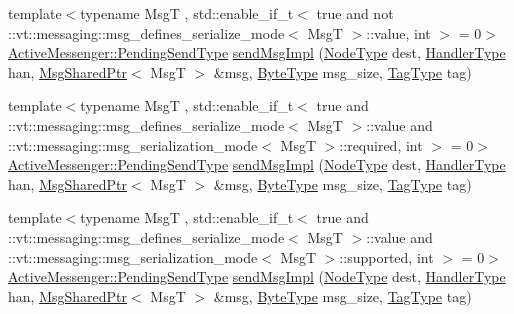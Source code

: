 \begin{DoxyCompactItemize}
\item 
{\footnotesize template$<$typename MsgT , std\+::enable\+\_\+if\+\_\+t$<$ true and not \+::vt\+::messaging\+::msg\+\_\+defines\+\_\+serialize\+\_\+mode$<$ Msg\+T $>$\+::value, int $>$  = 0$>$ }\\\hyperlink{structvt_1_1messaging_1_1_active_messenger_a3626a6ca76d8ad4ec7c3b47a2c70d3a8}{Active\+Messenger\+::\+Pending\+Send\+Type} \hyperlink{structvt_1_1messaging_1_1_active_messenger_ae4d52bd4014fe9cfee3a60bf477fe998}{send\+Msg\+Impl} (\hyperlink{namespacevt_a866da9d0efc19c0a1ce79e9e492f47e2}{Node\+Type} dest, \hyperlink{namespacevt_af64846b57dfcaf104da3ef6967917573}{Handler\+Type} han, \hyperlink{structvt_1_1messaging_1_1_msg_shared_ptr}{Msg\+Shared\+Ptr}$<$ MsgT $>$ \&msg, \hyperlink{namespacevt_aab8d55968084610ce3b17057981e9300}{Byte\+Type} msg\+\_\+size, \hyperlink{namespacevt_a84ab281dae04a52a4b243d6bf62d0e52}{Tag\+Type} tag)
\item 
{\footnotesize template$<$typename MsgT , std\+::enable\+\_\+if\+\_\+t$<$ true and \+::vt\+::messaging\+::msg\+\_\+defines\+\_\+serialize\+\_\+mode$<$ Msg\+T $>$\+::value and \+::vt\+::messaging\+::msg\+\_\+serialization\+\_\+mode$<$ Msg\+T $>$\+::required, int $>$  = 0$>$ }\\\hyperlink{structvt_1_1messaging_1_1_active_messenger_a3626a6ca76d8ad4ec7c3b47a2c70d3a8}{Active\+Messenger\+::\+Pending\+Send\+Type} \hyperlink{structvt_1_1messaging_1_1_active_messenger_ae4d52bd4014fe9cfee3a60bf477fe998}{send\+Msg\+Impl} (\hyperlink{namespacevt_a866da9d0efc19c0a1ce79e9e492f47e2}{Node\+Type} dest, \hyperlink{namespacevt_af64846b57dfcaf104da3ef6967917573}{Handler\+Type} han, \hyperlink{structvt_1_1messaging_1_1_msg_shared_ptr}{Msg\+Shared\+Ptr}$<$ MsgT $>$ \&msg, \hyperlink{namespacevt_aab8d55968084610ce3b17057981e9300}{Byte\+Type} msg\+\_\+size, \hyperlink{namespacevt_a84ab281dae04a52a4b243d6bf62d0e52}{Tag\+Type} tag)
\item 
{\footnotesize template$<$typename MsgT , std\+::enable\+\_\+if\+\_\+t$<$ true and \+::vt\+::messaging\+::msg\+\_\+defines\+\_\+serialize\+\_\+mode$<$ Msg\+T $>$\+::value and \+::vt\+::messaging\+::msg\+\_\+serialization\+\_\+mode$<$ Msg\+T $>$\+::supported, int $>$  = 0$>$ }\\\hyperlink{structvt_1_1messaging_1_1_active_messenger_a3626a6ca76d8ad4ec7c3b47a2c70d3a8}{Active\+Messenger\+::\+Pending\+Send\+Type} \hyperlink{structvt_1_1messaging_1_1_active_messenger_ae4d52bd4014fe9cfee3a60bf477fe998}{send\+Msg\+Impl} (\hyperlink{namespacevt_a866da9d0efc19c0a1ce79e9e492f47e2}{Node\+Type} dest, \hyperlink{namespacevt_af64846b57dfcaf104da3ef6967917573}{Handler\+Type} han, \hyperlink{structvt_1_1messaging_1_1_msg_shared_ptr}{Msg\+Shared\+Ptr}$<$ MsgT $>$ \&msg, \hyperlink{namespacevt_aab8d55968084610ce3b17057981e9300}{Byte\+Type} msg\+\_\+size, \hyperlink{namespacevt_a84ab281dae04a52a4b243d6bf62d0e52}{Tag\+Type} tag)

\end{DoxyCompactItemize}
